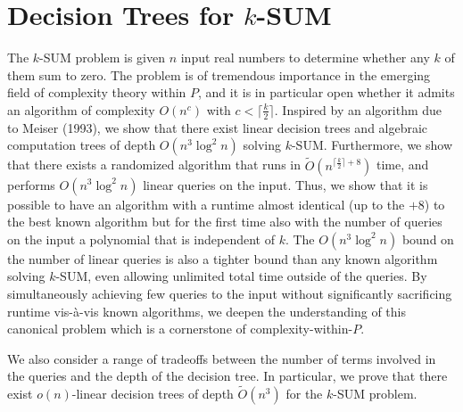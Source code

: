 \part{Decision Trees for $k$-SUM}

The $k$-SUM problem is given $n$ input real numbers to determine whether any
$k$ of them sum to zero. The problem is of tremendous importance in the
emerging field of complexity theory within $P$, and it is in particular open
whether it admits an algorithm of complexity $O(n^c)$ with $c<\lceil
\frac{k}{2} \rceil$. Inspired by an algorithm due to Meiser (1993), we show
that there exist linear decision trees and algebraic computation trees of depth
$O(n^3\log^2 n)$ solving $k$-SUM. Furthermore, we show that there exists a
randomized algorithm that runs in $\tilde{O}(n^{\lceil\frac{k}{2}\rceil+8})$ time,
and performs $O(n^3\log^2 n)$ linear queries on the input. Thus, we show that
it is possible to have an algorithm with a runtime almost identical (up to the
$+8$) to the best known algorithm but for the first time also with the number
of queries on the input a polynomial that is independent of $k$. The
$O(n^3\log^2 n)$ bound on the number of linear queries is also a tighter bound
than any known algorithm solving $k$-SUM, even allowing unlimited total time
outside of the queries.
By simultaneously achieving few queries to the input without significantly
sacrificing runtime vis-\`{a}-vis known algorithms, we deepen the understanding
of this canonical problem which is a cornerstone of complexity-within-$P$.

We also consider a range of tradeoffs between the number of terms involved in
the queries and the depth of the decision tree. In particular, we prove that
there exist $o(n)$-linear decision trees of depth $\tilde{O}(n^3)$ for the
$k$-SUM problem.






